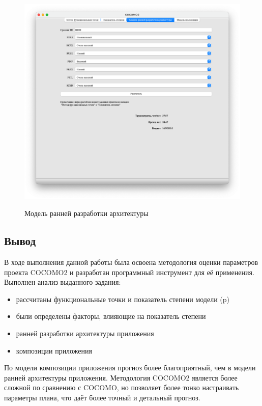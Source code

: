 \begin{figure}[ht!]
	\includegraphics[width=1\linewidth]{assets/images/2.3.png}
	\label{fig:r2}
	\caption{Модель ранней разработки архитектуры}
\end{figure}
\FloatBarrier



\subsection*{Вывод}

В ходе выполнения данной работы была освоена методология оценки параметров проекта COCOMO2 и разработан программный инструмент для её применения. Выполнен анализ выданного задания:
\begin{itemize}
	\item рассчитаны функциональные точки и показатель степени модели (p)
	\item были определены факторы, влияющие на показатель степени
	\item ранней разработки архитектуры приложения
	\item композиции приложения
\end{itemize}

По модели композиции приложения прогноз более благоприятный, чем в модели ранней архитектуры приложения.
Методология COCOMO2 является более сложной по сравнению с COCOMO, но позволяет более тонко настраивать параметры плана, что даёт более точный и детальный прогноз.
